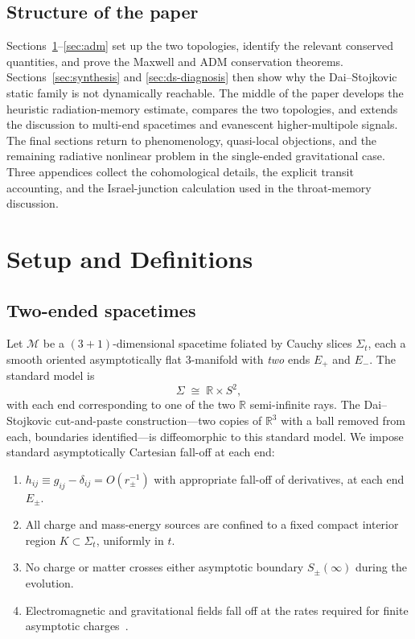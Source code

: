 \documentclass[aps,prd,onecolumn,nofootinbib,superscriptaddress]{revtex4-2}
\begin{document}
\subsection*{Structure of the paper}

Sections~\ref{sec:setup}--\ref{sec:adm} set up the two topologies, identify the
relevant conserved quantities, and prove the Maxwell and ADM conservation
theorems.  Sections~\ref{sec:synthesis} and \ref{sec:ds-diagnosis} then show
why the Dai--Stojkovic static family is not dynamically reachable.  The middle
of the paper develops the heuristic radiation-memory estimate, compares the
two topologies, and extends the discussion to multi-end spacetimes and
evanescent higher-multipole signals.  The final sections return to
phenomenology, quasi-local objections, and the remaining radiative nonlinear
problem in the single-ended gravitational case.  Three appendices collect the
cohomological details, the explicit transit accounting, and the Israel-junction
calculation used in the throat-memory discussion.

\section{Setup and Definitions}
\label{sec:setup}

\subsection{Two-ended spacetimes}

Let $\mathcal{M}$ be a $(3+1)$-dimensional spacetime foliated by Cauchy slices
$\Sigma_t$, each a smooth oriented asymptotically flat 3-manifold with
\emph{two} ends $E_+$ and $E_-$.  The standard model is
\begin{equation}
  \Sigma \;\cong\; \mathbb{R}\times S^2,
\end{equation}
with each end corresponding to one of the two $\mathbb{R}$ semi-infinite rays.
The Dai--Stojkovic cut-and-paste construction---two copies of $\mathbb{R}^3$
with a ball removed from each, boundaries identified---is diffeomorphic to this
standard model.  We impose standard asymptotically Cartesian fall-off at each
end:
\begin{enumerate}
  \item $h_{ij} \equiv g_{ij}-\delta_{ij} = O(r_\pm^{-1})$ with appropriate
    fall-off of derivatives, at each end $E_\pm$.
  \item All charge and mass-energy sources are confined to a fixed compact
    interior region $K\subset\Sigma_t$, uniformly in $t$.
  \item No charge or matter crosses either asymptotic boundary
    $S_\pm(\infty)$ during the evolution.
  \item Electromagnetic and gravitational fields fall off at the rates required
    for finite asymptotic
    charges~\cite{ArnowittDeserMisner1962Dynamics,ReggeTeitelboim1974SurfaceIntegrals,Bartnik1986Mass}.
\end{enumerate}
\end{document}
